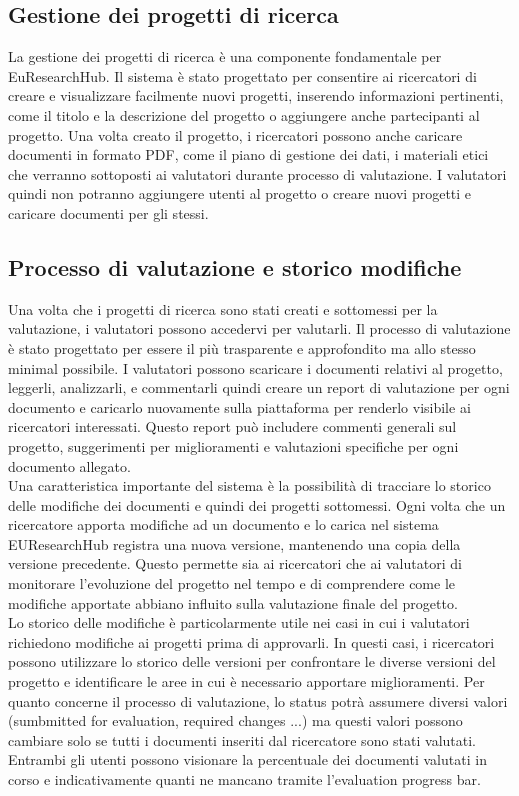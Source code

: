 \documentclass{report}
\begin{document}
\subsection{Gestione dei progetti di ricerca}
La gestione dei progetti di ricerca è una componente fondamentale per EuResearchHub. Il sistema è stato progettato per consentire ai ricercatori di creare e visualizzare facilmente nuovi progetti, inserendo informazioni pertinenti, come il titolo e la descrizione del progetto o aggiungere anche partecipanti al progetto.  Una volta creato il progetto, i ricercatori possono anche caricare documenti in formato PDF, come il piano di gestione dei dati, i materiali etici che verranno sottoposti ai valutatori durante processo di valutazione. I valutatori quindi non potranno aggiungere utenti al progetto o creare nuovi progetti e caricare documenti per gli stessi.\\
\subsection{Processo di valutazione e storico modifiche}
Una volta che i progetti di ricerca sono stati creati e sottomessi per la valutazione, i valutatori possono accedervi per valutarli. Il processo di valutazione è stato progettato per essere il più trasparente e approfondito ma allo stesso minimal possibile. I valutatori possono scaricare i documenti relativi al progetto, leggerli, analizzarli, e commentarli quindi creare un report di valutazione per ogni documento e caricarlo nuovamente sulla piattaforma per renderlo visibile ai ricercatori interessati. Questo report può includere commenti generali sul progetto, suggerimenti per miglioramenti e valutazioni specifiche per ogni documento allegato.\\
Una caratteristica importante del sistema è la possibilità di tracciare lo storico delle modifiche dei documenti e quindi dei progetti sottomessi. Ogni volta che un ricercatore apporta modifiche ad un documento e lo carica nel sistema EUResearchHub registra una nuova versione, mantenendo una copia della versione precedente. Questo permette sia ai ricercatori che ai valutatori di monitorare l'evoluzione del progetto nel tempo e di comprendere come le modifiche apportate abbiano influito sulla valutazione finale del progetto.\\
Lo storico delle modifiche è particolarmente utile nei casi in cui i valutatori richiedono modifiche ai progetti prima di approvarli. In questi casi, i ricercatori possono utilizzare lo storico delle versioni per confrontare le diverse versioni del progetto e identificare le aree in cui è necessario apportare miglioramenti. Per quanto concerne il processo di valutazione,  lo status potrà assumere diversi valori (sumbmitted for evaluation, required changes ...) ma questi valori possono cambiare solo se tutti i documenti inseriti dal ricercatore sono stati valutati.  Entrambi gli utenti possono visionare la percentuale dei documenti valutati in corso e indicativamente quanti ne mancano tramite l'evaluation progress bar. 
\end{document}

